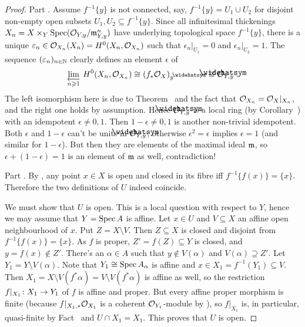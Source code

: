 \documentclass[a4paper,parskip=half,numbers=enddot, DIV=12]{scrreprt}
\renewcommand{\geq}{\geqslant}
\begin{document}
\begin{proof}
	Part . Assume $f^{-1}\{y\}$ is not connected, say, $f^{-1}\{y\}=U_1\cup U_2$ for disjoint non-empty open subsets $U_1,U_2\subseteq f^{-1}\{y\}$. Since all infinitesimal thickenings $X_n=X\times_Y\operatorname{Spec}(\mathcal{O}_{Y,y}/\mathfrak{m}_{Y,y}^n)$ have underlying topological space $f^{-1}\{y\}$, there is a unique $\varepsilon_n\in\mathcal{O}_{X_n}(X_n)=H^0(X_n,\mathcal{O}_{X_n})$ such that $\epsilon_n|_{U_1}=0$ and $\epsilon_n|_{U_2}=1$. The sequence $(\varepsilon_n)_{n\in\mathbb{N}}$ clearly defines an element $\epsilon$ of
	\begin{align*}
		\limit[n\geq 1]H^0(X_n,\Oo_{X_n})\cong (f_*\Oo_X)_y^\complete\cong \roof{\Oo}_{Y,y}\;.
	\end{align*}
	The left isomorphism here is due to Theorem~ and the fact that $\mathcal{O}_{X_n}=\mathcal{O}_X|_{X_n}$, and the right one holds by assumption. Hence $\roof{\Oo}_{Y,y}$ is a local ring (by Corollary~) with an idempotent $\epsilon\neq 0,1$. Then $1-\epsilon\neq 0,1$ is another non-trivial idempotent. Both $\epsilon$ and $1-\epsilon$ can't be units in $\roof{\Oo}_{Y,y}$, otherwise $\epsilon^2=\epsilon$ implies $\epsilon=1$ (and similar for $1-\epsilon$). But then they are elements of the maximal ideal $\mathfrak{m}$, so $\epsilon+(1-\epsilon)=1$ is an element of $\mathfrak{m}$ as well, contradiction!
	
	Part . By , any point $x\in X$ is open and closed in its fibre iff $f^{-1}\{f(x)\}=\{x\}$. Therefore the two definitions of $U$ indeed coincide. 
	
	We must show that $U$ is open. This is a local question with respect to $Y$, hence we may assume that $Y=\operatorname{Spec} A$ is affine. Let $x\in U$ and $V\subseteq X$ an affine open neighbourhood of $x$. Put $Z=X\setminus V$. Then $Z\subseteq X$ is closed and disjoint from $f^{-1}\{f(x)\}=\{x\}$. As $f$ is proper, $Z'=f(Z)\subseteq Y$ is closed, and $y=f(x)\notin Z'$. There's an $\alpha\in A$ such that $y\notin V(\alpha)$ and $V(\alpha)\supseteq Z'$. Let $Y_1=Y\setminus V(\alpha)$. Note that $Y_1\cong \operatorname{Spec} A_\alpha$ is affine and $x\in X_1=f^{-1}(Y_1)\subseteq V$. Then $X_1=X\setminus V(f^*\alpha)=V\setminus V(f^*\alpha)$ is affine as well, so the restriction $f|_{X_1}\colon X_1\morphism Y_1$ of $f$ is affine and proper. But every affine proper morphism is finite (because $f|_{X_1,*}\mathcal{O}_{X_1}$ is a coherent $\mathcal{O}_{Y_1}$-module by \cite[Theorem~5]{alggeo2}), so $f|_{X_1}$ is, in particular, quasi-finite by Fact~ and $U\cap X_1=X_1$. This proves that $U$ is open.
\end{proof}
\end{document}
